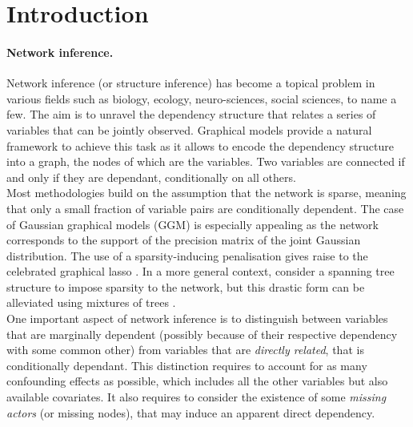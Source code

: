 \section{Introduction} \label{sec:Intro}


\paragraph{Network inference.}
Network inference (or structure inference) has become a topical problem in various fields such as biology, ecology, neuro-sciences, social sciences, to name a few. The aim is to unravel the dependency structure that relates a series of variables that can be jointly observed. Graphical models \citep[see e.g.][]{Lau96} provide a natural framework to achieve this task as it allows to encode the dependency structure into a graph, the nodes of which are the variables. Two variables are connected if and only if they are dependant, conditionally on all others. \\
Most methodologies build on the assumption that the network is sparse, meaning that only a small fraction of variable pairs are conditionally dependent. The case  of Gaussian graphical models (GGM) is especially appealing as the network corresponds to the support of the precision matrix of the joint Gaussian distribution. The use of a sparsity-inducing penalisation gives raise to the celebrated graphical lasso \citep{FHT08}. In a more general context, \cite{ChowLiu} consider a spanning tree structure to impose sparsity to the network, but this drastic form can be alleviated using mixtures of trees \citep{MeilaJaak,kirshner}. \\
One important aspect of network inference is to distinguish between variables that are marginally dependent (possibly because of their respective dependency with some common other) from variables that are {\sl directly related}, that is conditionally dependant. This distinction requires to account for as many confounding effects as possible, which includes all the other variables but also available covariates. It also requires to consider the existence of some {\sl missing actors} (or missing nodes), that may induce an apparent direct dependency.

